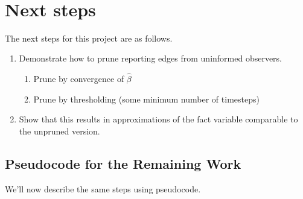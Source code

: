 \documentclass[11pt]{article}
\begin{document}
    \begin{center}
    \end{center}
    { \hspace*{\fill} \\}
    
    \hypertarget{next-steps}{%
\section{Next steps}\label{next-steps}}

The next steps for this project are as follows.

\begin{enumerate}
\def\labelenumi{\arabic{enumi}.}
\item
  Demonstrate how to prune reporting edges from uninformed observers.

  \begin{enumerate}
  \def\labelenumii{\alph{enumii}.}
  \item
    Prune by convergence of \(\hat{\beta}\)
  \item
    Prune by thresholding (some minimum number of timesteps)
  \end{enumerate}
\item
  Show that this results in approximations of the fact variable
  comparable to the unpruned version.
\end{enumerate}

\hypertarget{pseudocode-for-the-remaining-work}{%
\subsection{Pseudocode for the Remaining
Work}\label{pseudocode-for-the-remaining-work}}

We'll now describe the same steps using pseudocode.
\end{document}
